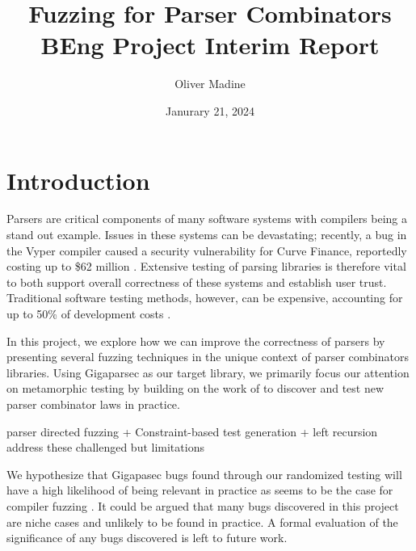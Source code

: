 \documentclass{article}
\title{Fuzzing for Parser Combinators \\ {\large BEng Project Interim Report}}
\author{Oliver Madine}
\date{Janurary 21, 2024}
\begin{document}
\maketitle


\section{Introduction} %


Parsers are critical components of many software systems with compilers being a stand out example. Issues in these systems can be devastating; recently, a bug in the Vyper compiler caused a security vulnerability for Curve Finance, reportedly costing up to \$62 million \cite{curve}. Extensive testing of parsing libraries is therefore vital to both support overall correctness of these systems and establish user trust. Traditional software testing methods, however, can be expensive, accounting for up to 50\% of development costs \cite{quickcheck}.

% 
% 
In this project, we explore how we can improve the correctness of parsers by presenting several fuzzing techniques in the unique context of parser combinators libraries. Using Gigaparsec as our target library, we primarily focus our attention on metamorphic testing by building on the work of \cite{staged-selective} to discover and test new parser combinator laws in practice.


parser directed fuzzing + Constraint-based test generation + left recursion address these challenged but limitations

We hypothesize that Gigapasec bugs found through our randomized testing will have a high likelihood of being relevant in practice as seems to be the case for compiler fuzzing \cite{fuzzing-importance}. It could be argued that many bugs discovered in this project are niche cases and unlikely to be found in practice. A formal evaluation of the significance of any bugs discovered is left to future work.
\end{document}
